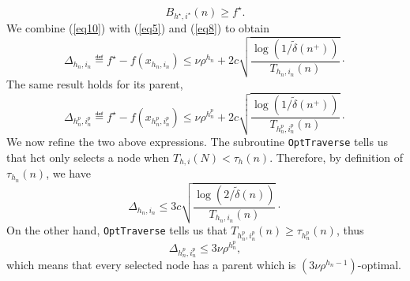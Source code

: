 \begin{equation} \label{eq10}
B_{h^\star,i^\star}(n) \geq f^\star.
\end{equation}
We combine (\ref{eq10}) with (\ref{eq5}) and (\ref{eq8}) to obtain
\begin{equation*} %
\Delta_{h_n,i_n} \eqdef f^\star - f(x_{h_n,i_n}) \leq \nu\rho^{h_n} + 2c\sqrt{\frac{\log(1/\tilde{\delta}(n^+))}{T_{h_n,i_n}(n)}}\cdot
\end{equation*}
The same result holds for its parent,
\begin{equation*} %
\Delta_{h_n^p,i_n^p} \eqdef f^\star - f(x_{h_n^p,i_n^p}) \leq \nu\rho^{h_n^p} + 2c\sqrt{\frac{\log(1/\tilde{\delta}(n^+))}{T_{h_n^p,i_n^p}(n)}}\cdot
\end{equation*}
We now refine the two above expressions. The subroutine \texttt{OptTraverse} tells us that \gls{hct} only selects a node when $T_{h,i}(N)<\tau_h(n)$. Therefore, by definition of $\tau_{h_n}(n)$, we have
\begin{equation} \label{eq13}
\Delta_{h_n,i_n} \leq 3c\sqrt{\frac{\log(2/\tilde{\delta}(n))}{T_{h_n,i_n}(n)}}\cdot
\end{equation}
On the other hand,  \texttt{OptTraverse} tells us that $T_{h_n^p,i_n^p}(n)\geq\tau_{h_n^p}(n)$, thus
\begin{equation*} %
\Delta_{h_n^p,i_n^p} \leq 3\nu\rho^{h_n^p},
\end{equation*}
which means that every selected node has a parent which is $(3\nu\rho^{h_n-1})$-optimal.


